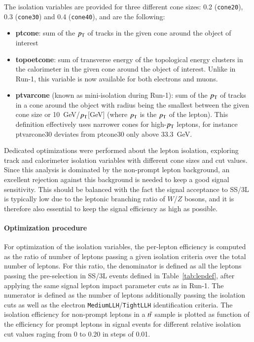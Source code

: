 The isolation variables are provided for three different cone sizes: 0.2 ({\tt cone20}), 0.3 ({\tt cone30}) 
and 0.4 ({\tt cone40}), and are the following:
\begin{itemize}
\item \textbf{ptcone}: sum of the $p_{\mathrm{T}}$ of tracks in the given cone around the object of interest
\item \textbf{topoetcone}: sum of transverse energy of the topological energy clusters in the calorimeter in the given cone 
around the object of interest. Unlike in Run-1, this variable is now available for both electrons and muons. 
\item \textbf{ptvarcone} (known as mini-isolation during Run-1):  sum of the $p_{\mathrm{T}}$ of tracks in a cone around the object 
with radius being the smallest between the given cone size or 10~GeV/$p_{\mathrm{T}}$[GeV] (where $p_{\mathrm{T}}$ is the $p_{\mathrm{T}}$ of the lepton). 
This definition effectively uses narrower cones for high-$p_{\mathrm{T}}$ leptons, 
for instance ptvarcone30 deviates from ptcone30 only above 33.3~GeV.
\end{itemize}

Dedicated optimizations were performed about the lepton isolation, exploring track and calorimeter isolation variables 
with different cone sizes and cut values. Since this analysis is dominated by the non-prompt lepton background,  
an excellent rejection against this background is needed to keep a good signal sensitivity. This should be balanced with 
the fact the signal acceptance to SS/3L is typically low due to the leptonic branching ratio of $W$/$Z$ bosons, and it is therefore 
also essential to keep the signal efficiency as high as possible.

\paragraph{Optimization procedure}

For optimization of the isolation variables, the per-lepton efficiency is computed as the ratio of number of leptons passing a given
isolation criteria over the total number of leptons. For this ratio, the denominator is defined as all the leptons passing the 
pre-selection in SS/3L events defined in Table~\ref{tab:lepdef}, after applying the same signal lepton impact parameter cuts as in Run-1. 
The numerator is defined 
as the number of leptons additionally passing the isolation cuts as well as the electron {\tt MediumLLH}/{\tt TightLLH} identification criteria.
The isolation efficiency for non-prompt leptons in a $t\bar{t}$ sample is plotted as function of the efficiency for prompt 
leptons in signal events for different relative isolation cut values raging from 0 to 0.20 in steps of 0.01.

